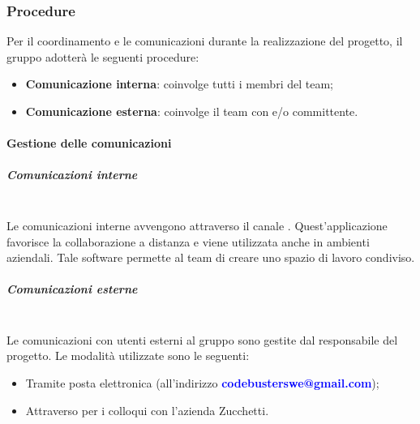 \subsubsection{Procedure}
Per il coordinamento e le comunicazioni durante la realizzazione del progetto, il gruppo adotterà le seguenti procedure: 
\begin{itemize}
\item\textbf{Comunicazione interna}: coinvolge tutti i membri del team;
\item\textbf{Comunicazione esterna}: coinvolge il team con  e/o committente.
\end{itemize}

\paragraph{Gestione delle comunicazioni}

\subparagraph{Comunicazioni interne} \mbox{} \\
Le comunicazioni interne avvengono attraverso il canale . Quest'applicazione favorisce la collaborazione a distanza e viene utilizzata anche in ambienti aziendali. Tale software permette al team di creare uno spazio di lavoro condiviso.
\subparagraph{Comunicazioni esterne} \mbox{} \\
Le comunicazioni con utenti esterni al gruppo sono gestite dal responsabile del progetto. Le modalità utilizzate sono le seguenti: 
\begin{itemize}
\item Tramite posta elettronica (all'indirizzo \textcolor{blue}{\textbf{codebusterswe@gmail.com}}); 
\item Attraverso  per i colloqui con l'azienda Zucchetti.
\end{itemize} 
